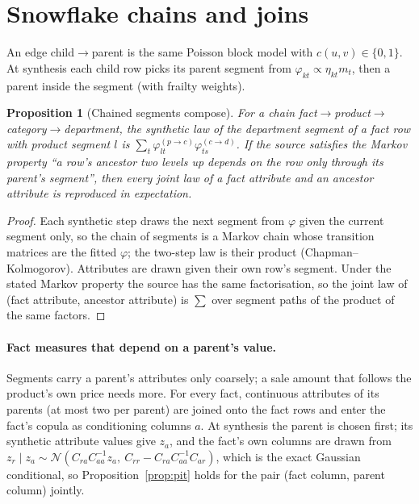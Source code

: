 \documentclass[11pt,a4paper]{article}
\newtheorem{proposition}{Proposition}
\theoremstyle{definition}
\theoremstyle{remark}
\begin{document}
\section{Snowflake chains and joins}\label{sec:snow}
An edge child$\to$parent is the same Poisson block model with $c(u,v)\in\{0,1\}$. At synthesis each child row picks its parent segment from $\varphi_{kt}\propto\eta_{kt}m_t$, then a parent inside the segment (with frailty weights).

\begin{proposition}[Chained segments compose]\label{prop:chain}
For a chain fact$\to$product$\to$category$\to$department, the synthetic law of the department segment of a fact row with product segment $l$ is $\sum_t\varphi^{(p\to c)}_{lt}\varphi^{(c\to d)}_{ts}$. If the source satisfies the Markov property ``a row's ancestor two levels up depends on the row only through its parent's segment'', then every joint law of a fact attribute and an ancestor attribute is reproduced in expectation.
\end{proposition}
\begin{proof}
Each synthetic step draws the next segment from $\varphi$ given the current segment only, so the chain of segments is a Markov chain whose transition matrices are the fitted $\varphi$; the two-step law is their product (Chapman--Kolmogorov). Attributes are drawn given their own row's segment. Under the stated Markov property the source has the same factorisation, so the joint law of (fact attribute, ancestor attribute) is $\sum$ over segment paths of the product of the same factors.
\end{proof}

\paragraph{Fact measures that depend on a parent's value.} Segments carry a parent's attributes only coarsely; a sale amount that follows the product's own price needs more. For every fact, continuous attributes of its parents (at most two per parent) are joined onto the fact rows and enter the fact's copula as conditioning columns $a$. At synthesis the parent is chosen first; its synthetic attribute values give $z_a$, and the fact's own columns are drawn from $z_r\mid z_a\sim\mathcal N(C_{ra}C_{aa}^{-1}z_a,\ C_{rr}-C_{ra}C_{aa}^{-1}C_{ar})$, which is the exact Gaussian conditional, so Proposition~\ref{prop:pit} holds for the pair (fact column, parent column) jointly.
\end{document}
